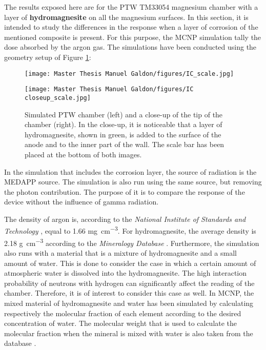 The results exposed here are for the PTW TM33054 magnesium chamber with a layer of \textbf{hydromagnesite} on all the magnesium surfaces. In this section, it is intended to study the differences in the response when a layer of corrosion of the mentioned composite is present. For this purpose, the MCNP simulation tally the dose absorbed by the argon gas.  The simulations have been conducted using the geometry setup of Figure \ref{fig:Simulated PTW (left) and closeup (right)}:

\begin{figure}[!h]
\centering
\begin{minipage}{0.5\textwidth}
    \centering
    \texttt{[image: Master Thesis Manuel Galdon/figures/IC\_scale.jpg]}
    \label{fig:IC}
\end{minipage}
\hfill
\begin{minipage}{0.4\textwidth}
    \centering
    \texttt{[image: Master Thesis Manuel Galdon/figures/IC closeup\_scale.jpg]}
\end{minipage}
\caption{Simulated PTW chamber (left) and a close-up of the tip of the chamber (right). In the close-up, it is noticeable that a layer of hydromagnesite, shown in green, is added to the surface of the anode and to the inner part of the wall. The scale bar has been placed at the bottom of both images. }
\label{fig:Simulated PTW (left) and closeup (right)}
\end{figure}

\newpage

In the simulation that includes the corrosion layer, the source of radiation is the MEDAPP source. The simulation is also run using the same source, but removing the photon contribution. The purpose of it is to compare the response of the device without the influence of gamma radiation.

The density of argon is, according to the \textit{National Institute of Standards and Technology} \cite{ESTAR}, equal to 1.66 \unit{\mg\per\cubic\cm}. For hydromagnesite, the average density is 2.18 \unit{\g\per\cubic\cm} according to the \textit{Mineralogy Database} \cite{MineralogyDatabase}.
Furthermore, the simulation also runs with a material that is a mixture of hydromagnesite and a small amount of water. This is done to consider the case in which a certain amount of atmospheric water is dissolved into the hydromagnesite. The high interaction probability of neutrons with hydrogen can significantly affect the reading of the chamber. Therefore, it is of interest to consider this case as well.
In MCNP, the mixed material of hydromagnesite and water has been simulated by calculating respectively the molecular fraction of each element according to the desired concentration of water. The molecular weight that is used to calculate the molecular fraction when the mineral is mixed with water is also taken from the database \cite{MineralogyDatabase}.

